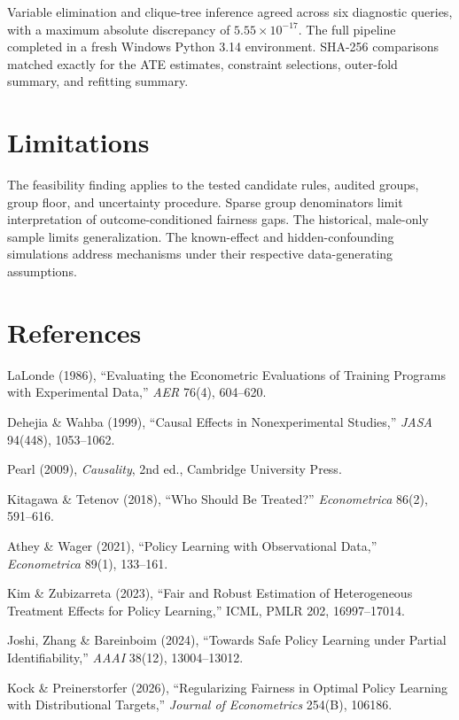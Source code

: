 \documentclass[10pt]{article}
\begin{document}
Variable elimination and clique-tree inference agreed across six diagnostic queries, with a maximum absolute discrepancy of $5.55\times10^{-17}$. The full pipeline completed in a fresh Windows Python 3.14 environment. SHA-256 comparisons matched exactly for the ATE estimates, constraint selections, outer-fold summary, and refitting summary.

\section{Limitations}
The feasibility finding applies to the tested candidate rules, audited groups, group floor, and uncertainty procedure. Sparse group denominators limit interpretation of outcome-conditioned fairness gaps. The historical, male-only sample limits generalization. The known-effect and hidden-confounding simulations address mechanisms under their respective data-generating assumptions.

\section*{References}
\small
\begin{enumerate}[label={[\arabic*]}]
\item LaLonde (1986), ``Evaluating the Econometric Evaluations of Training Programs with Experimental Data,'' \emph{AER} 76(4), 604--620.
\item Dehejia \& Wahba (1999), ``Causal Effects in Nonexperimental Studies,'' \emph{JASA} 94(448), 1053--1062.
\item Pearl (2009), \emph{Causality}, 2nd ed., Cambridge University Press.
\item Kitagawa \& Tetenov (2018), ``Who Should Be Treated?'' \emph{Econometrica} 86(2), 591--616.
\item Athey \& Wager (2021), ``Policy Learning with Observational Data,'' \emph{Econometrica} 89(1), 133--161.
\item Kim \& Zubizarreta (2023), ``Fair and Robust Estimation of Heterogeneous Treatment Effects for Policy Learning,'' ICML, PMLR 202, 16997--17014.
\item Joshi, Zhang \& Bareinboim (2024), ``Towards Safe Policy Learning under Partial Identifiability,'' \emph{AAAI} 38(12), 13004--13012.
\item Kock \& Preinerstorfer (2026), ``Regularizing Fairness in Optimal Policy Learning with Distributional Targets,'' \emph{Journal of Econometrics} 254(B), 106186.
\end{enumerate}
\end{document}
